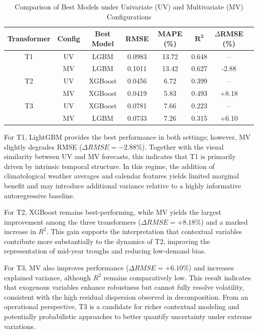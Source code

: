 \begin{table}[t]
\centering
\caption{Comparison of Best Models under Univariate (UV) and Multivariate (MV) Configurations}
\label{tab:final_comparison}
\footnotesize
\begin{tabular}{cccccccc}
\toprule
\textbf{Transformer} & \textbf{Config} & \textbf{Best Model} & \textbf{RMSE} & \textbf{MAPE (\%)} & $\mathbf{R^2}$ & \textbf{$\Delta$RMSE (\%)} \\
\midrule

T1 & UV & LGBM & 0.0983 & 13.72 & 0.648 & -- \\
     & MV & LGBM & 0.1011 & 13.42 & 0.627 & -2.88 \\

\midrule

T2 & UV & XGBoost & 0.0456 & 6.72 & 0.399 & -- \\
     & MV & XGBoost & 0.0419 & 5.83 & 0.493 & +8.18 \\

\midrule

T3 & UV & XGBoost & 0.0781 & 7.66 & 0.223 & -- \\
     & MV & LGBM & 0.0733 & 7.26 & 0.315 & +6.10 \\

\bottomrule
\end{tabular}
\end{table}


For T1, LightGBM provides the best performance in both settings; however, MV slightly degrades RMSE ($\Delta RMSE = -2.88\%$). Together with the visual similarity between UV and MV forecasts, this indicates that T1 is primarily driven by intrinsic temporal structure. In this regime, the addition of climatological weather averages and calendar features yields limited marginal benefit and may introduce additional variance relative to a highly informative autoregressive baseline.

For T2, XGBoost remains best-performing, while MV yields the largest improvement among the three transformers ($\Delta RMSE = +8.18\%$) and a marked increase in $R^2$. This gain supports the interpretation that contextual variables contribute more substantially to the dynamics of T2, improving the representation of mid-year troughs and reducing low-demand bias.

For T3, MV also improves performance ($\Delta RMSE = +6.10\%$) and increases explained variance, although $R^2$ remains comparatively low. This result indicates that exogenous variables enhance robustness but cannot fully resolve volatility, consistent with the high residual dispersion observed in decomposition. From an operational perspective, T3 is a candidate for richer contextual modeling and potentially probabilistic approaches to better quantify uncertainty under extreme variations.

